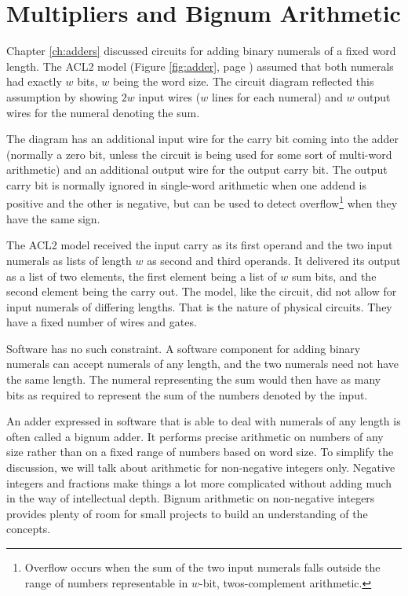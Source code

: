 \chapter{Multipliers and Bignum Arithmetic}
\label{ch:multipliers}


Chapter \ref{ch:adders} discussed circuits for adding binary numerals of a
fixed word length.
The ACL2 model (Figure \ref{fig:adder}, page \pageref{fig:adder})
assumed that both numerals had exactly $w$ bits, $w$ being the word size.
The circuit diagram reflected this assumption by
showing $2w$ input wires ($w$ lines for each numeral) and
$w$ output wires for the numeral denoting the sum.

The diagram has an additional input wire for the carry bit
coming into the adder (normally a zero bit, unless the circuit is being
used for some sort of multi-word arithmetic) and an additional output wire
for the output carry bit.
The output carry bit is normally ignored in single-word arithmetic
when one addend is positive and the other is negative,
but can be used to detect overflow\footnote{Overflow occurs
when the sum of the two input numerals falls outside
the range of numbers representable in $w$-bit, twos-complement
arithmetic.}
when they have the same sign.

The ACL2 model received the input carry as its first operand
and the two input numerals as lists of length $w$ as second and third operands.
It delivered its output as a list of two elements,
the first element being a list of $w$ sum bits,
and the second element being the carry out.
The model, like the circuit, did not allow for input numerals
of differing lengths.
That is the nature of physical circuits.
They have a fixed number of wires and gates.

Software has no such constraint.
A software component for adding binary numerals can accept
numerals of any length, and the two numerals need not have the same length.
The numeral representing the sum would then have as many bits as
required to represent the sum of the numbers
denoted by the input.

An adder expressed in software that is able to deal with numerals
of any length is often called a bignum adder.
It performs precise arithmetic on numbers of any size
rather than on a fixed range of numbers based on word size.
To simplify the discussion, we will talk about arithmetic
for non-negative integers only.
Negative integers and fractions make things a lot more complicated
without adding much in the way of intellectual depth.
Bignum arithmetic on non-negative integers provides plenty of room
for small projects to build an understanding of the concepts.

